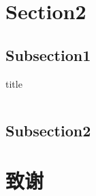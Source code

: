 \documentclass[aspectratio=1610]{beamer}
\begin{document}
\section{Section2}
\subsection{Subsection1}
\begin{frame}{title}
\begin{columns}
  \begin{column}{0.5\textwidth}
    

  \end{column}
  \begin{column}{0.5\textwidth}
    
    

  \end{column}
  
\end{columns}
\end{frame}
\subsection{Subsection2}
\begin{frame}
  
\end{frame}
\section{致谢}
\thankyou
\end{document}
